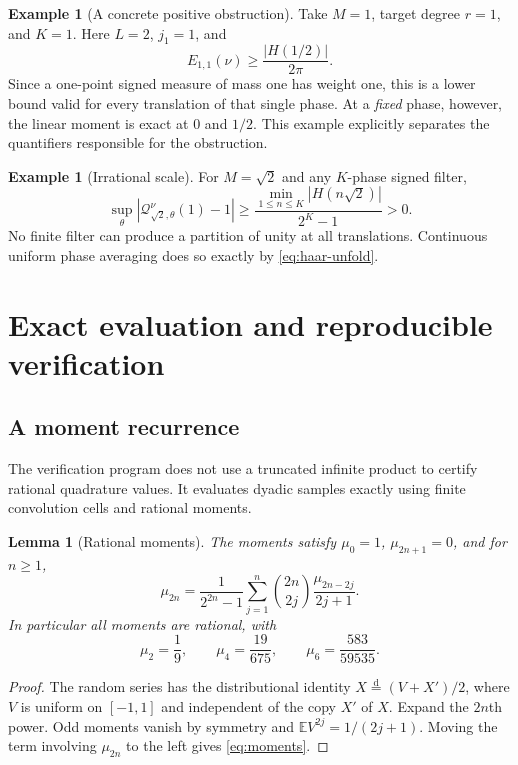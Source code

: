 \documentclass[11pt,a4paper]{article}
\numberwithin{equation}{section}
\newtheorem{lemma}[theorem]{Lemma}
\theoremstyle{definition}
\newtheorem{example}[theorem]{Example}
\theoremstyle{remark}
\newcommand{\Q}{\mathcal Q}\newcommand{\Def}{\mathcal D}
\begin{document}
\begin{example}[A concrete positive obstruction]
Take $M=1$, target degree $r=1$, and $K=1$. Here $L=2$, $j_1=1$, and
\[
 E_{1,1}(\nu)\ge\frac{|H(1/2)|}{2\pi}.
\]
Since a one-point signed measure of mass one has weight one, this is a
lower bound valid for every translation of that single phase. At a
\emph{fixed} phase, however, the linear moment is exact at $0$ and $1/2$. This example explicitly
separates the quantifiers responsible for the obstruction.
\end{example}

\begin{example}[Irrational scale]
For $M=\sqrt2$ and any $K$-phase signed filter,
\[
 \sup_\theta|\Q^\nu_{\sqrt2,\theta}(1)-1|
 \ge\frac{\min_{1\le n\le K}|H(n\sqrt2)|}{2^K-1}>0.
\]
No finite filter can produce a partition of unity at all translations.
Continuous uniform phase averaging does so exactly by
\eqref{eq:haar-unfold}.
\end{example}

\section{Exact evaluation and reproducible verification}

\subsection{A moment recurrence}

The verification program does not use a truncated infinite product to
certify rational quadrature values. It evaluates dyadic samples exactly
using finite convolution cells and rational moments.

\begin{lemma}[Rational moments]
\label{lem:moments}
The moments satisfy $\mu_0=1$, $\mu_{2n+1}=0$, and for $n\ge1$,
\begin{equation}
 \mu_{2n}=\frac1{2^{2n}-1}
 \sum_{j=1}^n\binom{2n}{2j}\frac{\mu_{2n-2j}}{2j+1}.
 \label{eq:moments}
\end{equation}
In particular all moments are rational, with
\[
 \mu_2=\frac19,\qquad \mu_4=\frac{19}{675},\qquad
 \mu_6=\frac{583}{59535}.
\]
\end{lemma}
\begin{proof}
The random series has the distributional identity
$X\overset{\mathrm d}=(V+X')/2$, where $V$ is uniform on $[-1,1]$
and independent of the copy $X'$ of $X$. Expand the $2n$th power.
Odd moments vanish by symmetry and $\mathbb E V^{2j}=1/(2j+1)$.
Moving the term involving $\mu_{2n}$ to the left gives
\eqref{eq:moments}.
\end{proof}
\end{document}
